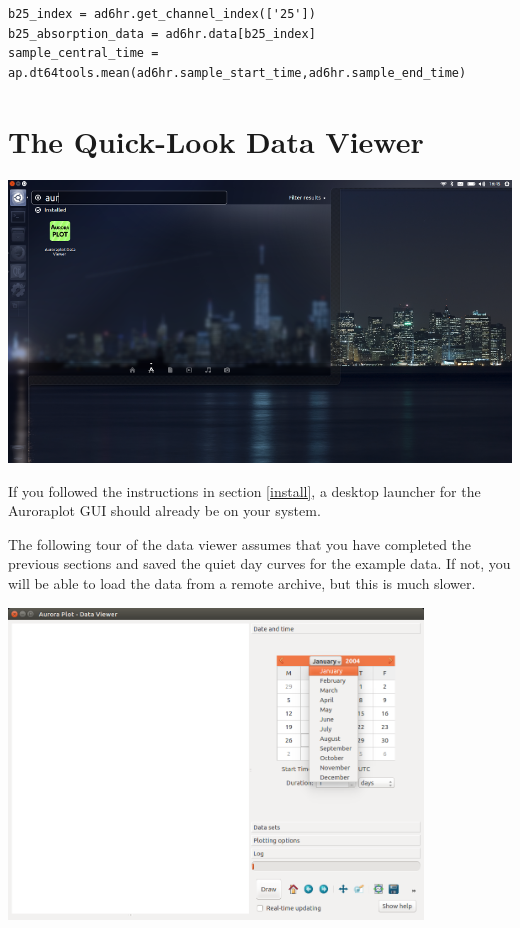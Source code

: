 \documentclass{article}
\begin{document}
\begin{lstlisting}[style=pythonstyle]
b25_index = ad6hr.get_channel_index(['25'])
b25_absorption_data = ad6hr.data[b25_index]
sample_central_time = ap.dt64tools.mean(ad6hr.sample_start_time,ad6hr.sample_end_time) 
\end{lstlisting}

\newpage 

\section{The Quick-Look Data Viewer}

\begin{center}
\includegraphics[width=15cm]{images/dv-0.png}
\end{center}

If you followed the instructions in section \ref{install}, a desktop launcher for the Auroraplot GUI should already be on your system.

The following tour of the data viewer assumes that you have completed the previous sections and saved the quiet day curves for the example data. If not, you will be able to load the data from a remote archive, but this is much slower.

\begin{center}
\includegraphics[width=11cm]{images/dv-1.png}
\end{center}
\end{document}
